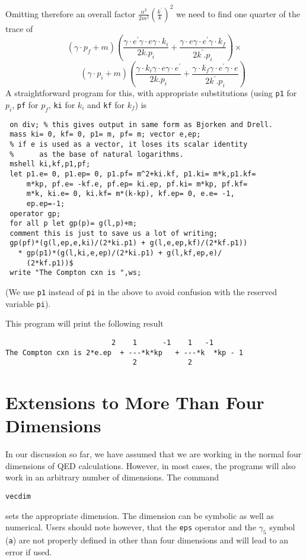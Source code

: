 Omitting therefore an overall factor
$\displaystyle\frac{\alpha^2}{2m^2}\left(\frac{k^\prime}{k}\right)^2$ we need to find one quarter of the trace of
\[
 \left( \gamma\cdot p_f + m\right)
 \left(\frac{\gamma\cdot e^\prime \gamma\cdot e\gamma\cdot k_i}{2k.p_i} +
  \frac{\gamma\cdot e\gamma\cdot e^\prime \gamma\cdot k_f}{2k^\prime.p_i}\right)\times
\]
\[
 \qquad\left(
  \gamma\cdot p_i + m\right)
 \left(\frac{\gamma\cdot k_i\gamma\cdot e\gamma\cdot e^\prime}{2k.p_i} +
  \frac{\gamma\cdot k_f\gamma\cdot e^\prime \gamma\cdot e}{2k^\prime.p_i}\right) 
\]
A straightforward \REDUCE{} program for this, with appropriate substitutions
(using \texttt{p1} for $p_i$, \texttt{pf} for $p_f$, \texttt{ki}
for $k_i$ and \texttt{kf} for $k_f$) is
\begin{verbatim}
 on div; % this gives output in same form as Bjorken and Drell.
 mass ki= 0, kf= 0, p1= m, pf= m; vector e,ep;
 % if e is used as a vector, it loses its scalar identity
 %      as the base of natural logarithms.
 mshell ki,kf,p1,pf;
 let p1.e= 0, p1.ep= 0, p1.pf= m^2+ki.kf, p1.ki= m*k,p1.kf=
     m*kp, pf.e= -kf.e, pf.ep= ki.ep, pf.ki= m*kp, pf.kf=
     m*k, ki.e= 0, ki.kf= m*(k-kp), kf.ep= 0, e.e= -1,
     ep.ep=-1;
 operator gp;
 for all p let gp(p)= g(l,p)+m;
 comment this is just to save us a lot of writing;
 gp(pf)*(g(l,ep,e,ki)/(2*ki.p1) + g(l,e,ep,kf)/(2*kf.p1))
   * gp(p1)*(g(l,ki,e,ep)/(2*ki.p1) + g(l,kf,ep,e)/
     (2*kf.p1))$
 write "The Compton cxn is ",ws;
\end{verbatim}

(We use \texttt{p1} instead of \texttt{pi} in the above to avoid confusion with
the reserved variable \texttt{pi}).

This program will print the following result
\begin{verbatim}
                         2    1      -1    1   -1
The Compton cxn is 2*e.ep  + ---*k*kp   + ---*k  *kp - 1
                              2            2
\end{verbatim}

\section{Extensions to More Than Four Dimensions}
\hypertarget{command:VECDIM}{}

In our discussion so far, we have assumed that we are working in the
normal four dimensions of QED calculations. However, in most cases, the
programs will also work in an arbitrary number of dimensions. The command
\begin{syntax}
  \texttt{vecdim }
\end{syntax}
sets the appropriate dimension. The dimension can be symbolic as well as
numerical. Users should note however, that the \texttt{eps} operator and the
$\gamma_{5}$ symbol (\texttt{a}) are not properly defined in other than four
dimensions and will lead to an error if used.

